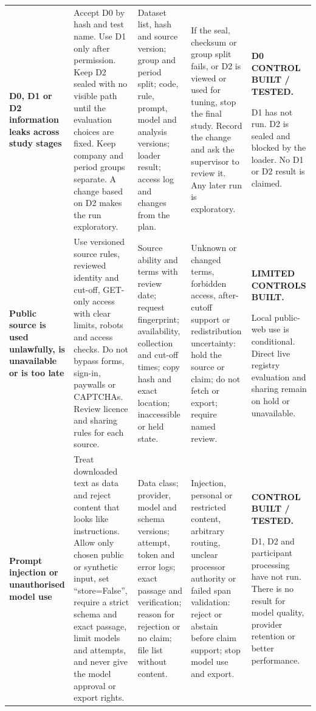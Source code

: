 \begin{longtable}{@{}P{0.145\textwidth}P{0.245\textwidth}P{0.19\textwidth}P{0.205\textwidth}P{0.17\textwidth}@{}}
    \addlinespace[1.5pt]
    \textbf{D0, D1 or D2 information leaks across study stages} &
    Accept D0 by hash and test name. Use D1 only after permission. Keep D2 sealed with no visible path until the evaluation choices are fixed. Keep company and period groups separate. A change based on D2 makes the run exploratory. &
    Dataset list, hash and source version; group and period split; code, rule, prompt, model and analysis versions; loader result; access log and changes from the plan. &
    If the seal, checksum or group split fails, or D2 is viewed or used for tuning, stop the final study. Record the change and ask the supervisor to review it. Any later run is exploratory. &
    \textbf{D0 CONTROL BUILT / TESTED.}\par D1 has not run. D2 is sealed and blocked by the loader. No D1 or D2 result is claimed. \\

    \addlinespace[1.5pt]
    \textbf{Public source is used unlawfully, is unavailable or is too late} &
    Use versioned source rules, reviewed identity and cut-off, GET-only access with clear limits, robots and access checks. Do not bypass forms, sign-in, paywalls or CAPTCHAs. Review licence and sharing rules for each source. &
    Source ability and terms with review date; request fingerprint; availability, collection and cut-off times; copy hash and exact location; inaccessible or held state. &
    Unknown or changed terms, forbidden access, after-cutoff support or redistribution uncertainty: hold the source or claim; do not fetch or export; require named review. &
    \textbf{LIMITED CONTROLS BUILT.}\par Local public-web use is conditional. Direct live registry evaluation and sharing remain on hold or unavailable. \\
    \pagebreak

    \addlinespace[1.5pt]
    \textbf{Prompt injection or unauthorised model use} &
    Treat downloaded text as data and reject content that looks like instructions. Allow only chosen public or synthetic input, set ``store=False'', require a strict schema and exact passage, limit models and attempts, and never give the model approval or export rights. &
    Data class; provider, model and schema versions; attempt, token and error logs; exact passage and verification; reason for rejection or no claim; file list without content. &
    Injection, personal or restricted content, arbitrary routing, unclear processor authority or failed span validation: reject or abstain before claim support; stop model use and export. &
    \textbf{CONTROL BUILT / TESTED.}\par D1, D2 and participant processing have not run. There is no result for model quality, provider retention or better performance. \\


\end{longtable}
